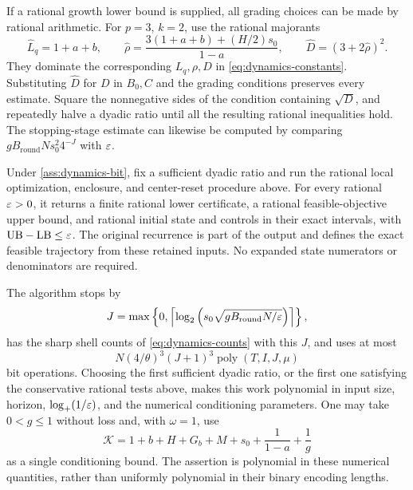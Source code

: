 If a rational growth lower bound is supplied, all grading choices can be
made by rational arithmetic.  For $p=3$, $k=2$, use the rational majorants
\[
 \widehat L_q=1+a+b,\qquad
 \widehat\rho=\frac{3(1+a+b)+(H/2)s_0}{1-a},\qquad
 \widehat D=(3+2\widehat\rho)^2.
\]
They dominate the corresponding $L_q,\rho,D$ in
\cref{eq:dynamics-constants}.  Substituting $\widehat D$ for $D$ in
$B_0,C$ and the grading conditions preserves every estimate.  Square the
nonnegative sides of the condition containing $\sqrt D$, and repeatedly
halve a dyadic ratio until all the resulting rational inequalities hold.
The stopping-stage estimate can likewise be computed by comparing
$gB_{\mathrm{round}}Ns_0^2 4^{-J}$ with $\varepsilon$.

\begin{theorem}
\label{thm:dynamics-bit}
Under \cref{ass:dynamics-bit}, fix a sufficient dyadic ratio and run the
rational local optimization, enclosure, and center-reset procedure above.
For every rational $\varepsilon>0$, it returns a finite rational lower certificate,
a rational feasible-objective upper bound, and rational initial state and
controls in their exact intervals, with $\mathrm{UB}-\mathrm{LB}\le\varepsilon$.
The original recurrence is part of the output and defines the exact feasible
trajectory from these retained inputs.  No expanded state numerators or
denominators are required.

The algorithm stops by
\[
 J=\max\left\{0,
       \left\lceil \log_2\left(s_0\sqrt{gB_{\mathrm{round}}N/\varepsilon}\right)\right\rceil
       \right\},
\]
has the sharp shell counts of \cref{eq:dynamics-counts} with this $J$,
and uses at most
\begin{equation}
 N(4/\theta)^3(J+1)^3\operatorname{poly}(T,I,J,\mu)
 \label{eq:bit-work}
\end{equation}
bit operations.  Choosing the first sufficient dyadic ratio, or the first
one satisfying the conservative rational tests above, makes this work
polynomial in input size, horizon, $\log_+(1/\varepsilon)$, and the numerical
conditioning parameters.  One may take $0<g\le1$ without loss and,
with $\omega=1$,
use
\[
 \mathcal K=1+b+H+G_b+M+s_0+\frac1{1-a}+\frac1g
\]
as a single conditioning bound.  The assertion is polynomial in these
numerical quantities, rather than uniformly polynomial in their binary
encoding lengths.
\end{theorem}

